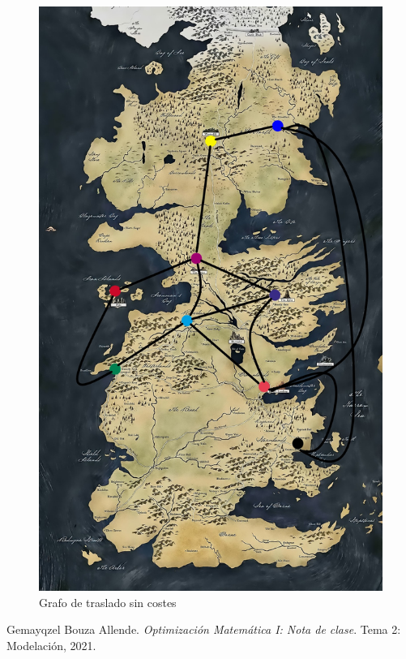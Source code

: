 \documentclass[a4paper,10pt,twocolumn]{article}
\theoremstyle{theorem}
\theoremstyle{definition}
\theoremstyle{remark}
\begin{document}
\begin{figure}[h!]%
	\begin{center}
		\begin{center}
			\includegraphics[scale=.2]{images/Poniente.jpg}
		\end{center}
	\caption{Grafo de traslado sin costes}\label{fig:ejer_6_map}
	\end{center}
\end{figure}


\begin{thebibliography}{99}
	
	 Gemayqzel Bouza Allende. \emph{Optimización Matemática I: Nota de clase}.
		Tema 2: Modelación, 2021.

\end{thebibliography}

\label{end}
\end{document}
